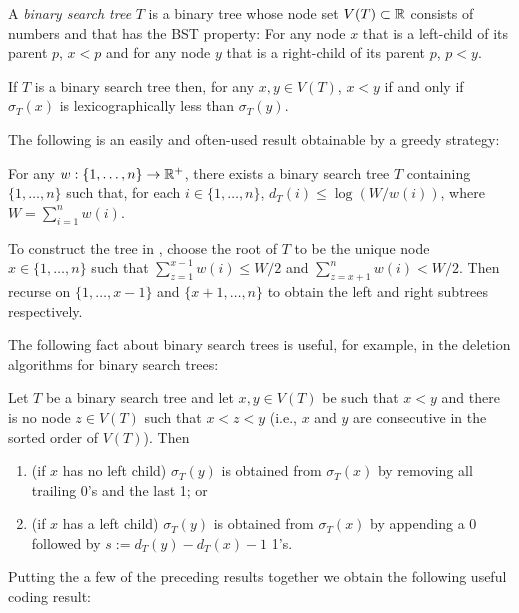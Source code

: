 \documentclass[kpfonts]{patmorin}
\begin{document}
A \emph{binary search tree} $T$ is a binary tree  whose node set $V(T)\subset\mathbb{R}$ consists of numbers and that has the BST property:  For any node $x$ that is a left-child of its parent $p$, $x<p$ and for any node $y$ that is a right-child of its parent $p$, $p<y$.  

\begin{obs}
  If $T$ is a binary search tree then, for any $x,y\in V(T)$, $x<y$ if and only if $\sigma_T(x)$ is lexicographically less than $\sigma_T(y)$.
\end{obs}

The following is an easily and often-used result obtainable by a greedy strategy: 

\begin{lem}
  For any $w:\{1,\ldots,n\}\to\mathbb{R}^+$, there exists a binary search tree $T$ containing $\{1,\ldots,n\}$ such that, for each $i\in\{1,\ldots,n\}$, $d_T(i)\le\log(W/w(i))$, where $W=\sum_{i=1}^n w(i)$.
\end{lem}

To construct the tree in , choose the root of $T$ to be the unique node $x\in\{1,\ldots,n\}$ such that $\sum_{z=1}^{x-1} w(i)\le W/2$ and $\sum_{z=x+1}^{n} w(i)< W/2$.  Then recurse on $\{1,\ldots,x-1\}$ and $\{x+1,\ldots,n\}$ to obtain the left and right subtrees respectively.

The following fact about binary search trees is useful, for example, in the deletion algorithms for binary search trees:

\begin{lem}
  Let $T$ be a binary search tree and let $x,y\in V(T)$ be such that $x<y$ and there is no node $z\in V(T)$ such that $x<z<y$ (i.e., $x$ and $y$ are consecutive in the sorted order of $V(T)$).  Then
  \begin{enumerate}
    \item (if $x$ has no left child) $\sigma_T(y)$ is obtained from $\sigma_T(x)$ by removing all trailing 0's and the last 1; or
    \item (if $x$ has a left child) $\sigma_T(y)$ is obtained from $\sigma_T(x)$ by appending a 0 followed by $s:=d_T(y)-d_T(x)-1$ 1's.
  \end{enumerate}
\end{lem}

Putting the a few of the preceding results together we obtain the following useful coding result:
\end{document}
